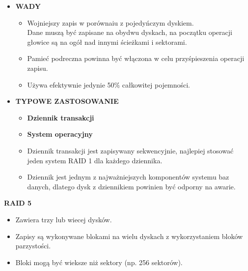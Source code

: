 \documentclass[a5paper,6pt]{article}
\begin{document}
\begin{itemize}
        \item \textbf{WADY}
        \begin{itemize}
            \item Wojniejszy zapis w porównaiu z pojedyńczym dyskiem.\\
                  Dane muszą być zapisane na obydwu dyskach, na początku
                  operacji głowice są na ogół nad innymi ścieżkami i sektorami.
            \item Pamieć podreczna powinna być włączona w celu przyśpieszenia
                  operacji zapisu.
            \item Używa efektywnie jedynie 50\% całkowitej pojemności.
        \end{itemize}

        \item \textbf{TYPOWE ZASTOSOWANIE}
        \begin{itemize}
            \item \textbf{Dziennik transakcji}
            \item \textbf{System operacyjny}
            \item Dziennik transakcji jest zapisywany sekwencyjnie, najlepiej
                  stosować jeden system RAID 1 dla każdego dziennika.
            \item Dziennik jest jednym z najważniejszych komponentów systemu
                  baz danych, dlatego dysk z dziennikiem powinien być odporny
                  na awarie.
        \end{itemize}

    \end{itemize}

\pagebreak

    \textbf{RAID 5}
    \begin{itemize}
        \item Zawiera trzy lub wiecej dysków.
        \item Zapisy są wykonywane blokami na wielu dyskach z wykorzystaniem
              bloków parzystości.
        \item Bloki mogą być wieksze niż sektory (np. 256 sektorów).
    \end{itemize}
\end{document}
